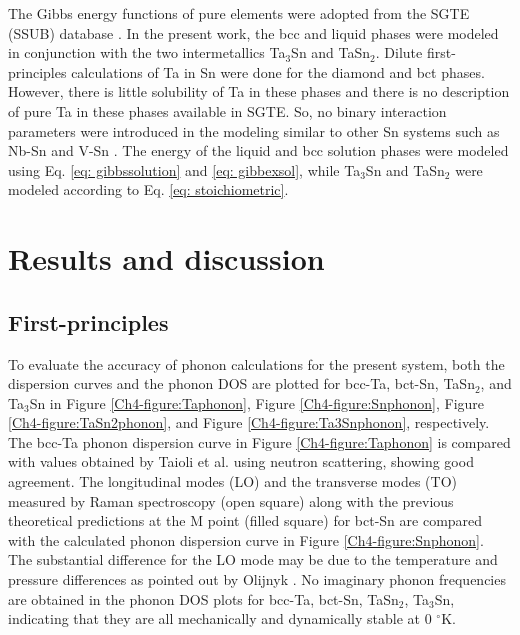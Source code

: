 The Gibbs energy functions of pure elements were adopted from the SGTE (SSUB) database \cite{Dinsdale1991}. In the present work, the bcc and liquid phases were modeled in conjunction with the two intermetallics Ta$_3$Sn and TaSn$_2$. Dilute first-principles calculations of Ta in Sn were done for the diamond and bct phases. However, there is little solubility of Ta in these phases and there is no description of pure Ta in these phases available in SGTE. So, no binary interaction parameters were introduced in the modeling similar to other Sn systems such as Nb-Sn and V-Sn \cite{Yue2009,Toffolon2002}. The energy of the liquid and bcc solution phases were modeled using Eq. \ref{eq: gibbssolution} and \ref{eq: gibbexsol}, while Ta$_3$Sn and TaSn$_2$ were modeled according to Eq. \ref{eq: stoichiometric}.

\section{Results and discussion}

\subsection{First-principles}

To evaluate the accuracy of phonon calculations for the present system, both the dispersion curves and the phonon DOS are plotted for bcc-Ta, bct-Sn, TaSn$_2$, and Ta$_3$Sn in Figure \ref{Ch4-figure:Taphonon},  Figure \ref{Ch4-figure:Snphonon}, Figure \ref{Ch4-figure:TaSn2phonon}, and Figure \ref{Ch4-figure:Ta3Snphonon}, respectively.  The bcc-Ta phonon dispersion curve in  Figure \ref{Ch4-figure:Taphonon} is compared with values obtained by Taioli et al. \cite{Taioli2007a} using neutron scattering, showing good agreement. The longitudinal modes (LO) and the transverse modes (TO) measured by Raman spectroscopy \cite{Olijnyk1992} (open square) along with the previous theoretical predictions at the M point (filled square) for bct-Sn are compared with the calculated phonon dispersion curve in Figure \ref{Ch4-figure:Snphonon}. The substantial difference for the LO mode may be due to the temperature and pressure differences as pointed out by Olijnyk \cite{Olijnyk1992}. No imaginary phonon frequencies are obtained in the phonon DOS plots for bcc-Ta, bct-Sn, TaSn$_2$, Ta$_3$Sn, indicating that they are all mechanically and dynamically stable at 0 $^\circ$K. 


